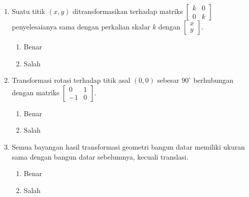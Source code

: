 \documentclass{article}
\begin{document}
\begin{enumerate}
    \item Suatu titik $(x,y)$ ditransformasikan terhadap matriks $\begin{bmatrix}
        k&0\\0&k
    \end{bmatrix}$ penyelesaianya sama dengan perkalian skalar $k$ dengan $\begin{bmatrix}
        x\\y
    \end{bmatrix}$.
    \begin{enumerate}
        \item[A.] Benar
        \item[B.] Salah
    \end{enumerate}
    \item Transformasi rotasi terhadap titik asal $(0,0)$ sebesar $90^{\circ}$ berhubungan dengan matriks $\begin{bmatrix}
        0&1\\-1&0
    \end{bmatrix}$.
    \begin{enumerate}
        \item[A.] Benar
        \item[B.] Salah
    \end{enumerate}
    \item Semua bayangan hasil transformasi geometri bangun datar memiliki ukuran sama dengan bangun datar sebelumnya, kecuali translasi.
    \begin{enumerate}
        \item[A.] Benar
        \item[B.] Salah
    \end{enumerate}

\end{enumerate}
\end{document}
